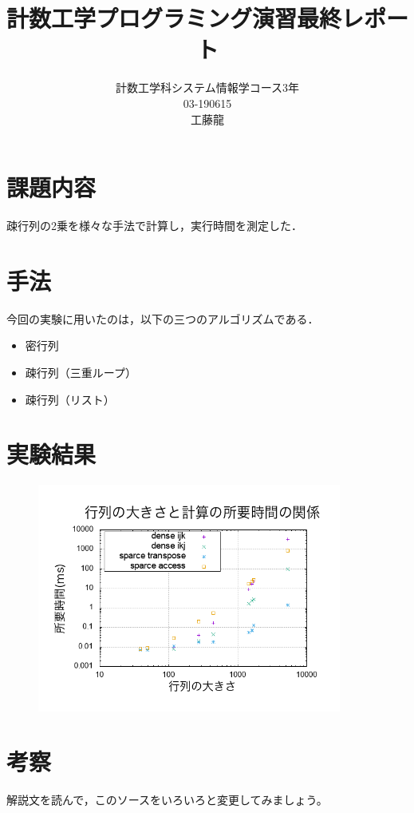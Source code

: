 \documentclass{jsarticle}
\begin{document}
\title{計数工学プログラミング演習最終レポート}
\author{計数工学科システム情報学コース3年\\03-190615\\工藤龍}
\maketitle

\section{課題内容}

疎行列の2乗を様々な手法で計算し，実行時間を測定した．


\section{手法}

今回の実験に用いたのは，以下の三つのアルゴリズムである．
\begin{itemize}
\item 密行列
\item 疎行列（三重ループ）
\item 疎行列（リスト）
\end{itemize}


\section{実験結果}

\begin{figure}[H]
  \begin{center}
  \includegraphics[width=10cm]{../graph.png}
  \end{center}
\end{figure}


\section{考察}

解説文を読んで，このソースをいろいろと変更してみましょう。
\end{document}
